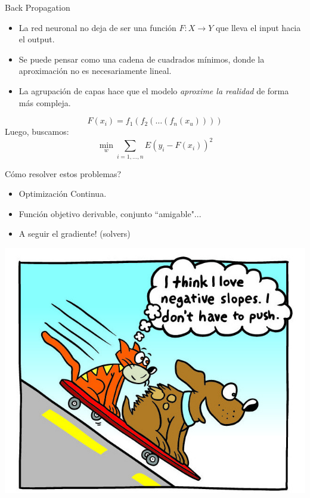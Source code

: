 \documentclass[12pt,aspectratio=169]{beamer}
\begin{document}
\begin{frame}{Back Propagation}

\begin{itemize}
\item La red neuronal no deja de ser una función $F: X \rightarrow Y$ que lleva el input hacia el output.
\item Se puede pensar como una cadena de cuadrados mínimos, donde la aproximación no es necesariamente lineal.
\item La agrupación de capas hace que el modelo \textit{aproxime la realidad} de forma más compleja.
\end{itemize}

$$
F(x_i) = f_1(f_2(\dots(f_n(x_u))))
$$
Luego, buscamos:
$$
\min_w \sum_{i=1,\dots,n}E(y_i - F(x_i))^2
$$

\end{frame}

\begin{frame}{Cómo resolver estos problemas?}
\begin{itemize}
\item Optimización Continua.
\item Función objetivo derivable, conjunto ``amigable"...
\item A seguir el gradiente! (solvers)
\end{itemize}

\begin{center}
	\includegraphics[width=.35\paperwidth]{slope.jpg}
\end{center}
\end{frame}
\end{document}
